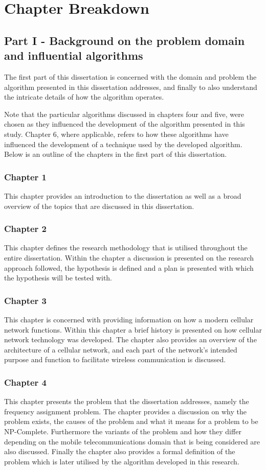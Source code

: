 \section {Chapter Breakdown}
\subsection{Part I - Background on the problem domain and influential algorithms}
The first part of this dissertation is concerned with the domain and problem the algorithm presented in this dissertation addresses, and finally to also understand the intricate details of how the algorithm operates.

Note that the particular algorithms discussed in chapters four and five, were chosen as they influenced the development of the algorithm presented in this study. Chapter 6, where applicable, refers to how these algorithms have influenced the development of a technique used by the developed algorithm.
Below is an outline of the chapters in the first part of this dissertation.
\subsubsection{Chapter 1}
This chapter provides an introduction to the dissertation as well as a broad overview of the topics that are discussed in this dissertation.
\subsubsection{Chapter 2}
This chapter defines the research methodology that is utilised throughout the entire dissertation. Within the chapter a discussion is presented on the research approach followed, the hypothesis is defined and a plan is presented with which the hypothesis will be tested with.
\subsubsection{Chapter 3}
This chapter is concerned with providing information on how a modern cellular network functions. Within this chapter a brief history is presented on how cellular network technology was developed. The chapter also provides an overview of the architecture of a cellular network, and each part of the network's intended purpose and function to facilitate wireless communication is discussed.
\subsubsection{Chapter 4}
This chapter presents the problem that the dissertation addresses, namely the frequency assignment problem. The chapter provides a discussion on why the problem exists, the causes of the problem and what it means for a problem to be NP-Complete. Furthermore the variants of the problem and how they differ depending on the mobile telecommunications domain that is being considered are also discussed. Finally the chapter also provides a formal definition of the problem which is later utilised by the algorithm developed in this research.
